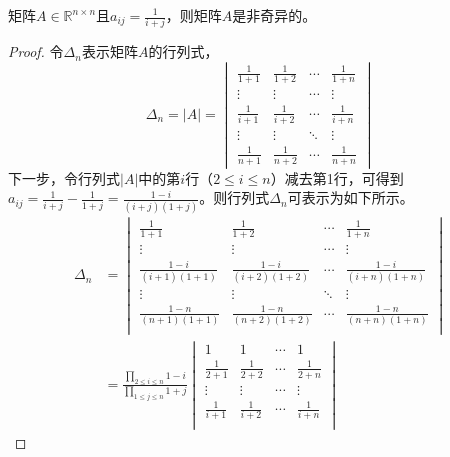 \begin{lemma}\label{lem:nonsingular}
矩阵$A \in \mathbb{R}^{n \times n}$且$a_{ij} = \frac{1}{i+j}$，则矩阵$A$是非奇异的。
\end{lemma}
\begin{proof}
令$\Delta_{n}$表示矩阵$A$的行列式，
\begin{equation}\label{eq:detetminant1}
    \Delta_{n}=\left\vert A \right\vert=
    \begin{vmatrix}
    \frac{1}{1+1} & \frac{1}{1+2} & \cdots & \frac{1}{1+n} \\
    \vdots & \vdots & \cdots & \vdots \\
    \frac{1}{i+1} & \frac{1}{i+2} & \cdots & \frac{1}{i+n} \\
    \vdots & \vdots & \ddots & \vdots \\
    \frac{1}{n+1} & \frac{1}{n+2} & \cdots & \frac{1}{n+n}
    \end{vmatrix}
\end{equation}
下一步，令行列式$\left\vert A \right\vert$中的第$i$行（$2\leq i \leq n$）减去第1行，可得到$a_{ij} = \frac{1}{i+j}-\frac{1}{1+j}=\frac{1-i}{\left(i+j\right)\left(1+j\right)}$。则行列式$\Delta_n$可表示为如下所示。
\begin{equation}\label{eq:detetminant2}
\begin{split}
    \Delta_n & =
    \begin{vmatrix}
    \frac{1}{1+1} & \frac{1}{1+2} & \cdots & \frac{1}{1+n} \\
    \vdots & \vdots & \cdots & \vdots \\
    \frac{1-i}{\left(i+1\right)\left(1+1\right)} & \frac{1-i}{\left(i+2\right)\left(1+2\right)} & \cdots & \frac{1-i}{\left(i+n\right)\left(1+n\right)} \\
    \vdots & \vdots & \ddots & \vdots \\
    \frac{1-n}{\left(n+1\right)\left(1+1\right)} & \frac{1-n}{\left(n+2\right)\left(1+2\right)} & \cdots & \frac{1-n}{\left(n+n\right)\left(1+n\right)} \\
    \end{vmatrix}\\
    & =
    \frac{\prod\limits_{2\leq i \leq n}{1-i}}{\prod\limits_{1\leq j \leq n}{1+j}}
    \begin{vmatrix}
    1 & 1 & \cdots & 1 \\
    \frac{1}{2+1} & \frac{1}{2+2} & \cdots & \frac{1}{2+n} \\
    \vdots & \vdots & \cdots & \vdots \\
    \frac{1}{i+1} & \frac{1}{i+2} & \cdots & \frac{1}{i+n} \\

\end{vmatrix}
\end{split}
\end{equation}
\end{proof}
